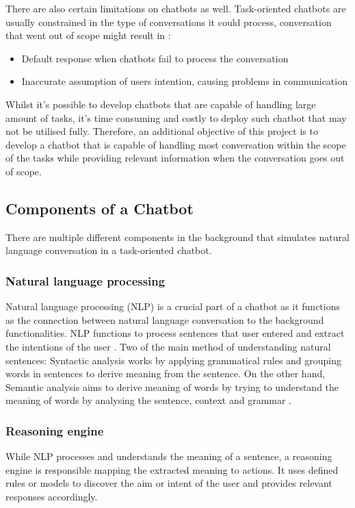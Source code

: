 \documentclass[11pt]{article}
\begin{document}
There are also certain limitations on chatbots as well. Task-oriented chatbots are usually constrained in the type of conversations it could process, conversation that went out of scope might result in \citep{ChatBotProsCons}:
\begin{itemize}
	\item Default response when chatbots fail to process the conversation
	\item Inaccurate assumption of users intention, causing problems in communication
\end{itemize}
Whilst it's possible to develop chatbots that are capable of handling large amount of tasks, it's time consuming and costly to deploy such chatbot that may not be utilised fully. Therefore, an additional objective of this project is to develop a chatbot that is capable of handling most conversation within the scope of the tasks while providing relevant information when the conversation goes out of scope.

\subsection{Components of a Chatbot}
There are multiple different components in the background that simulates natural language conversation in a task-oriented chatbot.
\subsubsection{Natural language processing}
Natural language processing (NLP) is a crucial part of a chatbot as it functions as the connection between natural language conversation to the background functionalities. NLP functions to process sentences that user entered and extract the intentions of the user \citep{NLPIntro}. Two of the main method of understanding natural sentences: Syntactic analysis works by applying grammatical rules and grouping words in sentences to derive meaning from the sentence. On the other hand, Semantic analysis aims to derive meaning of words by trying to understand the meaning of words by analysing the sentence, context and grammar \citep{NLPIntro}.

\subsubsection{Reasoning engine}
While NLP processes and understands the meaning of a sentence, a reasoning engine is responsible mapping the extracted meaning to actions. It uses defined rules or models to discover the aim or intent of the user and provides relevant responses accordingly.
\end{document}
